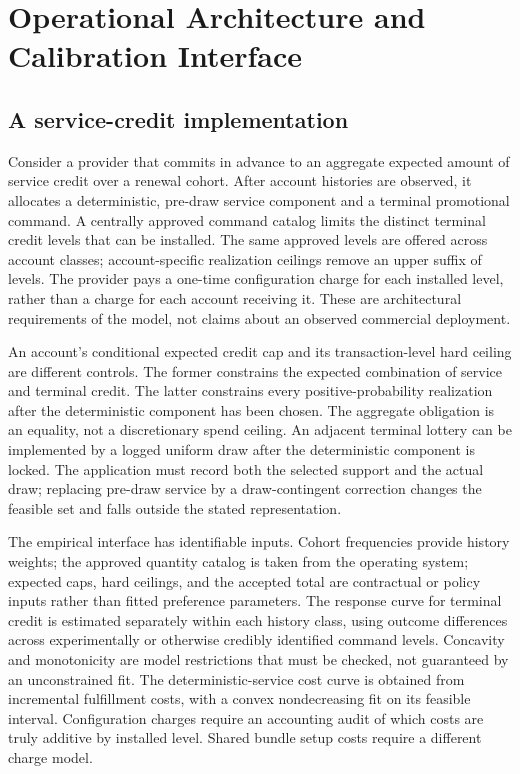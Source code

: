 \section{Operational Architecture and Calibration Interface}\label{sec:operations56}
\subsection{A service-credit implementation}
Consider a provider that commits in advance to an aggregate expected amount of service credit over a renewal cohort. After account histories are observed, it allocates a deterministic, pre-draw service component and a terminal promotional command. A centrally approved command catalog limits the distinct terminal credit levels that can be installed. The same approved levels are offered across account classes; account-specific realization ceilings remove an upper suffix of levels. The provider pays a one-time configuration charge for each installed level, rather than a charge for each account receiving it. These are architectural requirements of the model, not claims about an observed commercial deployment.

An account's conditional expected credit cap and its transaction-level hard ceiling are different controls. The former constrains the expected combination of service and terminal credit. The latter constrains every positive-probability realization after the deterministic component has been chosen. The aggregate obligation is an equality, not a discretionary spend ceiling. An adjacent terminal lottery can be implemented by a logged uniform draw after the deterministic component is locked. The application must record both the selected support and the actual draw; replacing pre-draw service by a draw-contingent correction changes the feasible set and falls outside the stated representation.

The empirical interface has identifiable inputs. Cohort frequencies provide history weights; the approved quantity catalog is taken from the operating system; expected caps, hard ceilings, and the accepted total are contractual or policy inputs rather than fitted preference parameters. The response curve for terminal credit is estimated separately within each history class, using outcome differences across experimentally or otherwise credibly identified command levels. Concavity and monotonicity are model restrictions that must be checked, not guaranteed by an unconstrained fit. The deterministic-service cost curve is obtained from incremental fulfillment costs, with a convex nondecreasing fit on its feasible interval. Configuration charges require an accounting audit of which costs are truly additive by installed level. Shared bundle setup costs require a different charge model.

